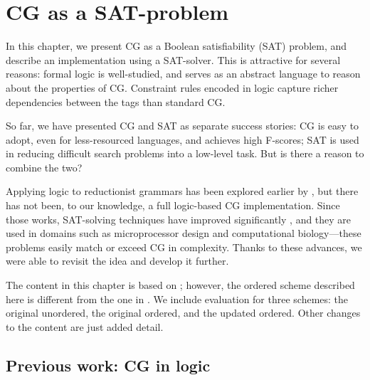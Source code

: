 \chapter{CG as a SAT-problem}
\label{chapterCGSAT}

In this chapter, we present CG as a Boolean satisfiability (SAT) problem,
and describe an implementation using a SAT-solver. 
This is attractive for several reasons: formal logic is
well-studied, and serves as an abstract language to reason about the
properties of CG. Constraint rules encoded in logic capture richer
dependencies between the tags than standard CG. 


So far, we have presented CG and SAT as separate success stories: CG is easy to adopt, even for less-resourced languages, and achieves high F-scores; SAT is used in reducing difficult search problems into a low-level task.
But is there a reason to combine the two? 

Applying logic to reductionist grammars has been explored earlier by \cite{lager98,lager_nivre01}, but there has not been, to our knowledge, a full logic-based CG implementation.
Since those works, SAT-solving techniques have improved significantly \cite{marques_silva2010}, and they are used in domains such as microprocessor design and computational 
biology---these problems easily match or exceed CG in complexity. 
Thanks to these advances, we were able to revisit the idea and develop it
further. 


The content in this chapter is based on \cite{listenmaa_claessen2015}; 
however, the ordered scheme described here is different from the one in \cite{listenmaa_claessen2015}.
We include evaluation for three schemes: the original unordered, the original ordered, and the updated ordered.
Other changes to the content are just added detail.



\section{Previous work: CG in logic}\label{encoding-in-logic}





